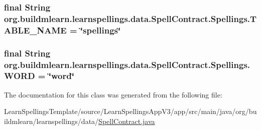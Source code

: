 \subsubsection[{\texorpdfstring{T\+A\+B\+L\+E\+\_\+\+N\+A\+ME}{TABLE_NAME}}]{\setlength{\rightskip}{0pt plus 5cm}final String org.\+buildmlearn.\+learnspellings.\+data.\+Spell\+Contract.\+Spellings.\+T\+A\+B\+L\+E\+\_\+\+N\+A\+ME = \char`\"{}spellings\char`\"{}\hspace{0.3cm}{\ttfamily [static]}}\hypertarget{classorg_1_1buildmlearn_1_1learnspellings_1_1data_1_1SpellContract_1_1Spellings_a8eda8e58ff9bf6c1d1ab5de4d2744ec3}{}\label{classorg_1_1buildmlearn_1_1learnspellings_1_1data_1_1SpellContract_1_1Spellings_a8eda8e58ff9bf6c1d1ab5de4d2744ec3}
\subsubsection[{\texorpdfstring{W\+O\+RD}{WORD}}]{\setlength{\rightskip}{0pt plus 5cm}final String org.\+buildmlearn.\+learnspellings.\+data.\+Spell\+Contract.\+Spellings.\+W\+O\+RD = \char`\"{}word\char`\"{}\hspace{0.3cm}{\ttfamily [static]}}\hypertarget{classorg_1_1buildmlearn_1_1learnspellings_1_1data_1_1SpellContract_1_1Spellings_ac4bea7e7b831f1f8db8ee1c2b20efe80}{}\label{classorg_1_1buildmlearn_1_1learnspellings_1_1data_1_1SpellContract_1_1Spellings_ac4bea7e7b831f1f8db8ee1c2b20efe80}


The documentation for this class was generated from the following file\+:\begin{DoxyCompactItemize}
\item 
Learn\+Spellings\+Template/source/\+Learn\+Spellings\+App\+V3/app/src/main/java/org/buildmlearn/learnspellings/data/\hyperlink{SpellContract_8java}{Spell\+Contract.\+java}\end{DoxyCompactItemize}
